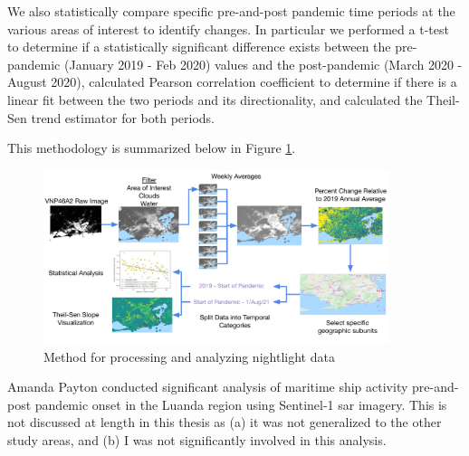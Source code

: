We also statistically compare specific pre-and-post pandemic time periods at the various areas of interest to identify changes. In particular we performed a t-test to determine if a statistically significant difference exists between the pre-pandemic (January 2019 - Feb 2020) values and the post-pandemic (March 2020 - August 2020), calculated Pearson correlation coefficient to determine if there is a linear fit between the two periods and its directionality, and calculated the Theil-Sen trend estimator for both periods.

This methodology is summarized below in Figure \ref{fig:nightlights_method}.

\begin{figure}[!htb]
\centering
\includegraphics[width=0.9\textwidth]{Figures/chap5/nightlights_method.png}
\caption[Nightlights Processing Methodology]{Method for processing and analyzing nightlight data}
\label{fig:nightlights_method}
\end{figure}


%

Amanda Payton conducted significant analysis of maritime ship activity pre-and-post pandemic onset in the Luanda region using Sentinel-1 \ac{sar} imagery. This is not discussed at length in this thesis as (a) it was not generalized to the other study areas, and (b) I was not significantly involved in this analysis.

